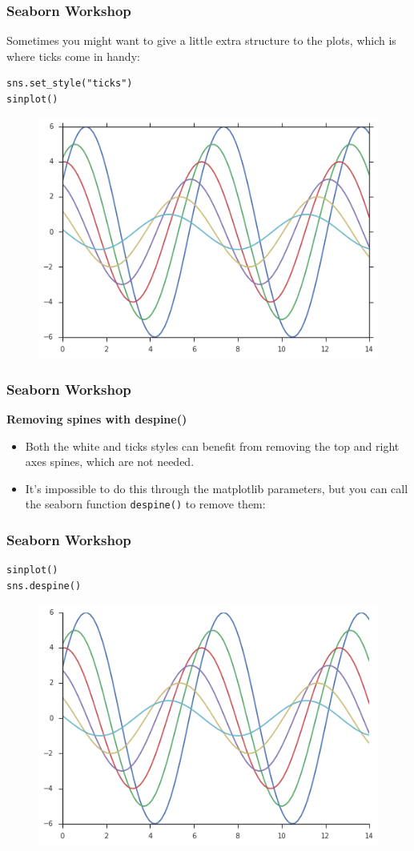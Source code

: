 \documentclass{beamer}
\begin{document}
\begin{frame}[fragile]
\frametitle{Seaborn Workshop}
\large
Sometimes you might want to give a little extra structure to the plots, which is where ticks come in handy:
\begin{verbatim}
sns.set_style("ticks")
sinplot()
\end{verbatim}

\begin{figure}
\centering
\includegraphics[width=0.7\linewidth]{images/aesthetics_19_0}
\caption{}
\label{fig:aesthetics_19_0}
\end{figure}



\end{frame}
\begin{frame}[fragile]
\frametitle{Seaborn Workshop}
\large
\noindent \textbf{Removing spines with despine()}\\
\begin{itemize}
\item Both the white and ticks styles can benefit from removing the top and right axes spines, which are not needed.
\item  It’s impossible to do this through the matplotlib parameters, but you can call the seaborn function \texttt{despine()} to remove them:
\end{itemize}
\end{frame}
\begin{frame}[fragile]
	\frametitle{Seaborn Workshop}
	\large
\begin{verbatim}
sinplot()
sns.despine()
\end{verbatim}

\begin{figure}
\centering
\includegraphics[width=0.7\linewidth]{images/aesthetics_21_0}
\caption{}
\label{fig:aesthetics_21_0}
\end{figure}


\end{frame}
\end{document}
